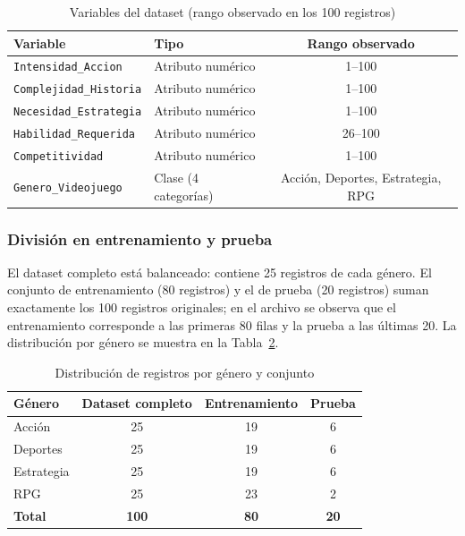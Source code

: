\documentclass[]{article}
\begin{document}
\begin{table}[H]
\centering
\small
\caption{Variables del dataset (rango observado en los 100 registros)}
\label{tab:variables}
\begin{tabular}{l l c}
\toprule
\textbf{Variable} & \textbf{Tipo} & \textbf{Rango observado} \\
\midrule
\texttt{Intensidad\_Accion} & Atributo numérico & 1--100 \\
\texttt{Complejidad\_Historia} & Atributo numérico & 1--100 \\
\texttt{Necesidad\_Estrategia} & Atributo numérico & 1--100 \\
\texttt{Habilidad\_Requerida} & Atributo numérico & 26--100 \\
\texttt{Competitividad} & Atributo numérico & 1--100 \\
\texttt{Genero\_Videojuego} & Clase (4 categorías) & Acción, Deportes, Estrategia, RPG \\
\bottomrule
\end{tabular}
\end{table}

\subsubsection{División en entrenamiento y prueba}

El dataset completo está balanceado: contiene 25 registros de cada género. El conjunto de entrenamiento (80 registros) y el de prueba (20 registros) suman exactamente los 100 registros originales; en el archivo se observa que el entrenamiento corresponde a las primeras 80 filas y la prueba a las últimas 20. La distribución por género se muestra en la Tabla~\ref{tab:distribucion}.

\begin{table}[H]
\centering
\small
\caption{Distribución de registros por género y conjunto}
\label{tab:distribucion}
\begin{tabular}{l c c c}
\toprule
\textbf{Género} & \textbf{Dataset completo} & \textbf{Entrenamiento} & \textbf{Prueba} \\
\midrule
Acción     & 25  & 19 & 6 \\
Deportes   & 25  & 19 & 6 \\
Estrategia & 25  & 19 & 6 \\
RPG        & 25  & 23 & 2 \\
\midrule
\textbf{Total} & \textbf{100} & \textbf{80} & \textbf{20} \\
\bottomrule
\end{tabular}
\end{table}
\end{document}
